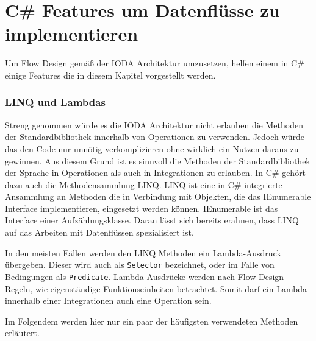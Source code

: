 \section{C\# Features um Datenflüsse zu implementieren}

Um Flow Design gemäß der IODA Architektur umzusetzen, helfen einem in C\# einige Features die in diesem Kapitel vorgestellt werden.

\subsubsection{LINQ und Lambdas}

Streng genommen würde es die IODA Architektur nicht erlauben die Methoden der
Standardbibliothek innerhalb von Operationen zu verwenden. Jedoch würde das den
Code nur unnötig verkomplizieren ohne wirklich ein Nutzen daraus zu gewinnen.
Aus diesem Grund ist es sinnvoll die Methoden der Standardbibliothek der Sprache
in Operationen als auch in Integrationen zu erlauben.
In C\# gehört dazu auch die Methodensammlung LINQ. 
LINQ ist eine in C\# integrierte Ansammlung an Methoden die in Verbindung mit
Objekten, die das IEnumerable Interface implementieren, eingesetzt werden
können.
IEnumerable ist das Interface einer Aufzählungsklasse. Daran lässt sich bereits erahnen, dass LINQ
auf das Arbeiten mit Datenflüssen spezialisiert ist.

In den meisten Fällen werden den LINQ Methoden ein Lambda-Ausdruck übergeben.
Dieser wird auch als \texttt{Selector} bezeichnet, oder im Falle von Bedingungen als \texttt{Predicate}.
Lambda-Ausdrücke werden nach Flow Design Regeln, wie eigenständige
Funktionseinheiten betrachtet. Somit darf ein Lambda innerhalb einer 
Integrationen auch eine Operation sein.




\bigskip
Im Folgendem werden hier nur ein paar der häufigsten verwendeten Methoden erläutert.


